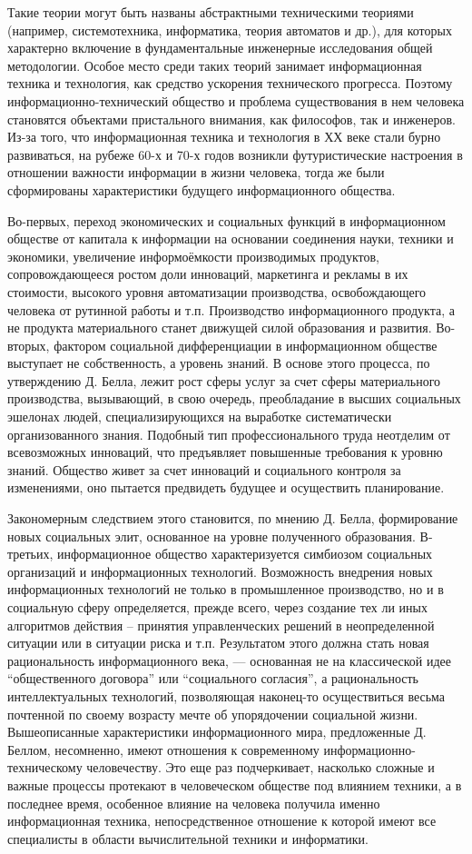 Такие теории могут быть названы абстрактными техническими теориями (например, системотехника, информатика, теория автоматов и др.), для которых характерно включение в фундаментальные инженерные исследования общей методологии. Особое место среди таких теорий занимает информационная техника и технология, как средство ускорения технического прогресса. Поэтому информационно-технический общество и проблема существования в нем человека становятся объектами пристального внимания, как философов, так и инженеров. Из-за того, что информационная техника и технология в ХХ веке стали бурно развиваться, на рубеже 60-х и 70-х годов возникли футуристические настроения в отношении важности информации в жизни человека, тогда же были сформированы характеристики будущего информационного общества.

Во-первых, переход экономических и социальных функций в информационном обществе от капитала к информации на основании соединения науки, техники и экономики, увеличение информоёмкости производимых продуктов, сопровождающееся ростом доли инноваций, маркетинга и рекламы в их стоимости, высокого уровня автоматизации производства, освобождающего человека от рутинной работы и т.п. Производство информационного продукта, а не продукта материального станет движущей силой образования и развития.  Во-вторых, фактором социальной дифференциации в информационном обществе выступает не собственность, а уровень знаний. В основе этого процесса, по утверждению Д. Белла, лежит рост сферы услуг за счет сферы материального производства, вызывающий, в свою очередь, преобладание в высших социальных эшелонах людей, специализирующихся на выработке систематически организованного знания. Подобный тип профессионального труда неотделим от всевозможных инноваций, что предъявляет повышенные требования к уровню знаний. Общество живет за счет инноваций и социального контроля за изменениями, оно пытается предвидеть будущее и осуществить планирование.

Закономерным следствием этого становится, по мнению Д. Белла, формирование новых социальных элит, основанное на уровне полученного образования.  В-третьих, информационное общество характеризуется симбиозом социальных организаций и информационных технологий. Возможность внедрения новых информационных технологий не только в промышленное производство, но и в социальную сферу определяется, прежде всего, через создание тех ли иных алгоритмов действия – принятия управленческих решений в неопределенной ситуации или в ситуации риска и т.п. Результатом этого должна стать новая рациональность информационного века, — основанная не на классической идее ``общественного договора'' или ``социального согласия'', а рациональность интеллектуальных технологий, позволяющая наконец-то осуществиться весьма почтенной по своему возрасту мечте об упорядочении социальной жизни.  Вышеописанные характеристики информационного мира, предложенные Д. Беллом, несомненно, имеют отношения к современному информационно-техническому человечеству. Это еще раз подчеркивает, насколько сложные и важные процессы протекают в человеческом обществе под влиянием техники, а в последнее время, особенное влияние на человека получила именно информационная техника, непосредственное отношение к которой имеют все специалисты в области вычислительной техники и информатики.

